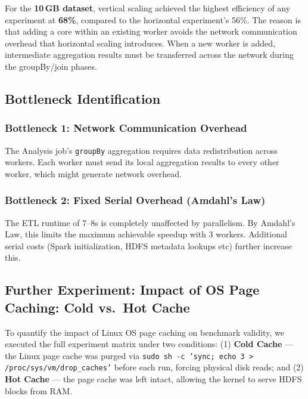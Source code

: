 For the \textbf{10\,GB dataset}, vertical scaling achieved the highest efficiency of any experiment at \textbf{68\%}, compared to the horizontal experiment's 56\%. The reason is that adding a core within an existing worker avoids the network communication overhead that horizontal scaling introduces. When a new worker is added, intermediate aggregation results must be transferred across the network during the groupBy/join phases. 

\subsection{Bottleneck Identification}
\label{sec:bottlenecks}

\subsubsection{Bottleneck 1: Network Communication Overhead}
The Analysis job's \texttt{groupBy} aggregation requires data redistribution across workers. Each worker must send its local aggregation results to every other worker, which might generate network overhead.

\subsubsection{Bottleneck 2: Fixed Serial Overhead (Amdahl's Law)}
The ETL runtime of 7--8s is completely unaffected by parallelism. By Amdahl's Law, this  limits the maximum achievable speedup with 3 workers. Additional serial costs (Spark  initialization, HDFS metadata lookups etc) further increase this.



\subsection{Further Experiment: Impact of OS Page Caching: Cold vs.~Hot Cache}

To quantify the impact of Linux OS page caching on benchmark validity, we executed the full experiment matrix under two conditions: (1) \textbf{Cold Cache} — the Linux page cache was purged via \texttt{sudo sh -c 'sync; echo 3 > /proc/sys/vm/drop\_caches'} before each run, forcing physical disk reads; and (2) \textbf{Hot Cache} — the page cache was left intact, allowing the kernel to serve HDFS blocks from RAM.

